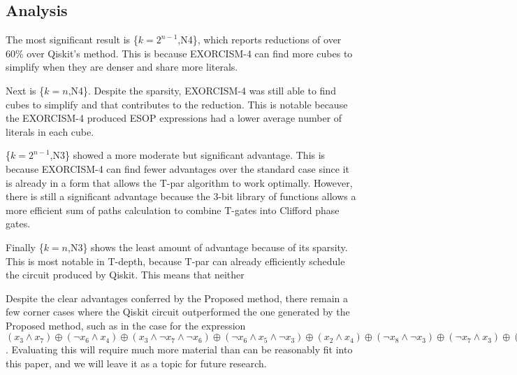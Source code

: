 \subsection{Analysis}
The most significant result is \{$k=2^{n-1}$,N4\}, which reports reductions of over 60\% over
Qiskit's method. This is because EXORCISM-4 can find more cubes to simplify when they are denser
and share more literals.

Next is \{$k=n$,N4\}. Despite the sparsity, EXORCISM-4 was still able to find cubes to simplify
and that contributes to the reduction. This is notable because the EXORCISM-4 produced ESOP
expressions had a lower average number of literals in each cube.

\{$k=2^{n-1}$,N3\} showed a more moderate but significant advantage. This is because EXORCISM-4
can find fewer advantages over the standard case since it is already in a form that allows
the T-par algorithm to work optimally. However, there is still a significant advantage because
the 3-bit library of functions allows a more efficient sum of paths calculation to combine
T-gates into Clifford phase gates.

Finally \{$k=n$,N3\} shows the least amount of advantage because of its sparsity. This is most
notable in T-depth, because T-par can already efficiently schedule the circuit produced by Qiskit.
This means that neither 

Despite the clear advantages conferred by the Proposed method, there remain a few corner
cases where the Qiskit circuit outperformed the one generated by the Proposed method, such as
in the case for the expression $(x_3 \land x_7) \oplus (\lnot x_6 \land x_4) \oplus (x_3 \land \lnot x_7 \land \lnot x_6) \oplus (\lnot x_6 \land x_5 \land \lnot x_3) \oplus (x_2 \land x_4) \oplus (\lnot x_8 \land \lnot x_3) \oplus (\lnot x_7 \land x_3) \oplus (x_1 \land \lnot x_8) \oplus (\lnot x_1 \land \lnot x_8) \oplus (x_2 \land x_4 \land x_3) \oplus (x_3 \land x_5) \oplus (\lnot x_7 \land x_6)$.
Evaluating this will require much more material than can be reasonably fit into this paper,
and we will leave it as a topic for future research.

\label{Exp:An}

